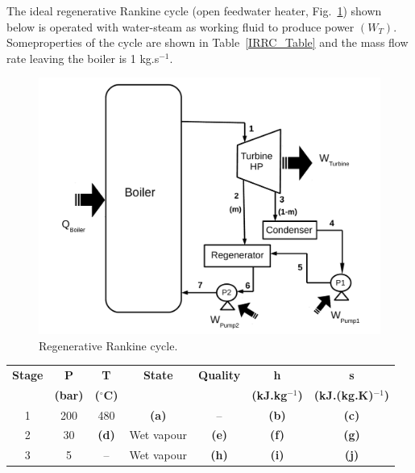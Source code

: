 \documentclass[calculator,steamtables,refrigeranttables,psychrometricchart,datasheet,resit]{exam}
\begin{document}
\begin{question}
The ideal regenerative Rankine cycle (open feedwater heater, Fig.~\ref{exam2_Q3_rankinecycle}) shown below is operated with water-steam as working fluid to produce power $\left(W_{T}\right)$. Someproperties of the cycle are shown in Table~\ref{IRRC_Table} and the mass flow rate leaving the boiler is 1 kg.s$^{-1}$.
      \begin{figure}[h]
      \begin{center}
      \includegraphics[width=10.cm,clip]{./Pics/Exam_Reheat_Regenerative2_Rankine_Cycle}
      \caption{Regenerative Rankine cycle.}
      \label{exam2_Q3_rankinecycle}
     \end{center} 
     \end{figure}
\begin{table}[b]
\begin{center}
\begin{tabular}{c | c c c c c c} 
\hline
{\bf Stage} & {\bf P}       & {\bf T}            &  {\bf State}  &  {\bf Quality}  & {\bf h}             & {\bf s}                  \\
            & {\bf (bar)}   & {\bf ($^{\circ}$C)} &               &                 &{\bf (kJ.kg$^{-1}$)}  & {\bf (kJ.(kg.K)$^{-1}$)}  \\
\hline
1           &  200          & 480                &  {\bf (a)}    &   --            & {\bf (b)}           & {\bf (c)}                 \\
2           &  30           & {\bf (d)}          &  Wet vapour   & {\bf (e)}       & {\bf (f)}           & {\bf (g)}                \\
3           &  5            & --                 &  Wet vapour   & {\bf (h)}       & {\bf (i)}           & {\bf (j)}                \\

\end{tabular}
\end{center}
\end{table}
\end{question}
\end{document}
